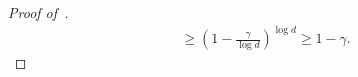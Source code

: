 \begin{proof}[Proof of~]
\begin{align*}
&\geq \left(1 - \frac{\gamma}{\log d}\right)^{\log d} \geq 1 - \gamma.
\end{align*}



\end{proof}
